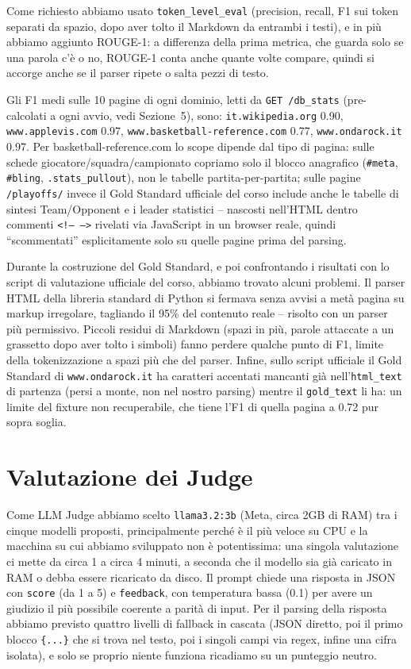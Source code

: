 \documentclass[11pt]{article}
\begin{document}
Come richiesto abbiamo usato \texttt{token\_level\_eval} (precision, recall,
F1 sui token separati da spazio, dopo aver tolto il Markdown da entrambi i
testi), e in più abbiamo aggiunto ROUGE-1: a differenza della prima metrica,
che guarda solo se una parola c'è o no, ROUGE-1 conta anche quante volte
compare, quindi si accorge anche se il parser ripete o salta pezzi di testo.

Gli F1 medi sulle 10 pagine di ogni dominio, letti da \texttt{GET
/db\_stats} (pre-calcolati a ogni avvio, vedi Sezione~5), sono:
\texttt{it.wikipedia.org} 0.90, \texttt{www.applevis.com} 0.97,
\texttt{www.basketball-reference.com} 0.77, \texttt{www.ondarock.it} 0.97.
Per basketball-reference.com lo scope dipende dal tipo di pagina: sulle
schede giocatore/squadra/campionato copriamo solo il blocco anagrafico
(\texttt{\#meta}, \texttt{\#bling}, \texttt{.stats\_pullout}), non le
tabelle partita-per-partita; sulle pagine \texttt{/playoffs/} invece il
Gold Standard ufficiale del corso include anche le tabelle di sintesi
Team/Opponent e i leader statistici -- nascosti nell'HTML dentro commenti
\texttt{<!-- -->} rivelati via JavaScript in un browser reale, quindi
``scommentati'' esplicitamente solo su quelle pagine prima del parsing.

Durante la costruzione del Gold Standard, e poi confrontando i risultati
con lo script di valutazione ufficiale del corso, abbiamo trovato alcuni
problemi. Il parser HTML della libreria standard di Python si fermava senza
avvisi a metà pagina su markup irregolare, tagliando il 95\% del contenuto
reale -- risolto con un parser più permissivo. Piccoli residui di Markdown
(spazi in più, parole attaccate a un grassetto dopo aver tolto i simboli)
fanno perdere qualche punto di F1, limite della tokenizzazione a spazi più
che del parser. Infine, sullo script ufficiale il Gold Standard di
\texttt{www.ondarock.it} ha caratteri accentati mancanti già
nell'\texttt{html\_text} di partenza (persi a monte, non nel nostro
parsing) mentre il \texttt{gold\_text} li ha: un limite del fixture non
recuperabile, che tiene l'F1 di quella pagina a 0.72 pur sopra soglia.

\section{Valutazione dei Judge}

Come LLM Judge abbiamo scelto \texttt{llama3.2:3b} (Meta, circa 2GB di RAM)
tra i cinque modelli proposti, principalmente perché è il più veloce su CPU
e la macchina su cui abbiamo sviluppato non è potentissima: una singola
valutazione ci mette da circa 1 a circa 4 minuti, a seconda che il modello
sia già caricato in RAM o debba essere ricaricato da disco. Il prompt chiede
una risposta in JSON con \texttt{score} (da 1 a 5) e \texttt{feedback}, con
temperatura bassa (0.1) per avere un giudizio il più possibile coerente a
parità di input. Per il parsing della risposta abbiamo previsto quattro
livelli di fallback in cascata (JSON diretto, poi il primo blocco
\texttt{\{...\}} che si trova nel testo, poi i singoli campi via regex,
infine una cifra isolata), e solo se proprio niente funziona ricadiamo su un
punteggio neutro.
\end{document}
